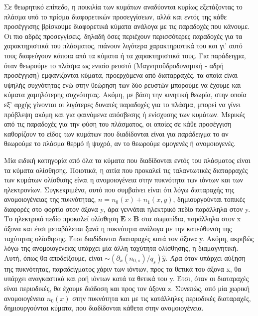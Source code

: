\documentclass[a4paper]{article}
\begin{document}
	Σε θεωρητικό επίπεδο, η ποικιλία των κυμάτων αναδύονται κυρίως εξετάζοντας το πλάσμα υπό το πρίσμα διαφορετικών προσεγγίσεων, αλλά και εντός της κάθε προσέγγισης βρίσκουμε διαφορετικά κύματα ανάλογα με τις παραδοχές που κάνουμε. Οι πιο αδρές προσεγγίσεις, δηλαδή όσες περιέχουν περισσότερες παραδοχές για τα χαρακτηριστικά του πλάσματος, πιάνουν λιγότερα χαρακτηριστικά του και γι' αυτό τους διαφεύγουν κάποια από τα κύματα ή τα χαρακτηριστικά τους. Για παράδειγμα, όταν θεωρούμε το πλάσμα ως ενιαίο ρευστό (Μαγνητοϋδροδυναμική - αδρή προσέγγιση) εμφανίζονται κύματα, προερχόμενα από διαταρραχές, τα οποία είναι υψηλής συχνότητας ενώ στην θεώρηση των δύο ρευστών μπορούμε να έχουμε και κύματα χαμηλότερης συχνότητας. 
	Ακόμη, με βάση την κινητική θεωρία, στην οποία εξ' αρχής γίνονται οι λιγότερες δυνατές παραδοχές για το πλάσμα, μπορεί να γίνει πρόβλεψη ακόμη και για φαινόμενα απόσβεσης ή ενίσχυσης των κυμάτων.
	 Μερικές από τις παραδοχές για την φύση του πλάσματος, οι οποίες σε κάθε προσέγγιση καθορίζουν το είδος των κυμάτων που διαδίδονται είναι για παράδειγμα το αν θεωρούμε το πλάσμα θερμό ή ψυχρό, αν το θεωρούμε ομογενές ή ανομοιογενές.
	
	Μία ειδική κατηγορία από όλα τα κύματα που διαδίδονται εντός του πλάσματος είναι τα κύματα ολίσθησης.	
	Ποιοτικά, η αιτία που προκαλεί τις ταλαντωτικές διαταρραχές των κυμάτων ολίσθισης είναι η ανομοιογένεια στην πυκνότητα των ιόντων και των ηλεκτρονίων. 
	Συγκεκριμένα, αυτό που συμβαίνει είναι ότι λόγω διαταραχής της ανομοιογένειας της πυκνότητας, $n = n_0(x) + n_1(x,y)$, 
 δημιουργούνται τοπικές διαφορές στο φορτίο στον άξονα y, άρα γεννάται ηλεκτρικό πεδίο παράλληλα στον y. 
 Το ηλεκτρικό πεδίο προκαλεί ολίσθηση $\bm{E}\times\bm{B}$ στα σωματίδια, παράλληλα  στον x άξονα και έτσι μεταβάλεται ξανά η πυκνότητα ανάλογα με την κατεύθυνση της ταχύτητας ολίσθησης.
 Έτσι διαδίδονται διαταραχές κατά τον άξονα y. 
 Ακόμη, ακριβώς λόγω της ανομοιογένειας υπάρχει μία άλλη ταχύτητα ολίσθησης, η διαμαγνητική. Αυτή, όπως θα αποδείξουμε, είναι $\sim (\partial_x (n_{0,s})/q_s)\hat{y}$. Άρα όταν υπάρχει αύξηση της πυκνότητας, παραδείγματος χάριν των ιόντων, προς τα θετικά του άξονα x,  θα υπάρχει αναγκαστικά και ροή ιόντων κατά τα θετικά του y. Έτσι, όταν οι διαταραχές είναι περιοδικές, θα έχουμε διάδοση και προς τον άξονα z. Συνεπώς, από μία χωρική ανομοιογένεια $n_0(x)$ στην πυκνότητα και με τις κατάλληλες περιοδικές διαταραχές, δημιουργούνται κύματα, που διαδίδονται κάθετα στην ανομοιογένεια.
\end{document}
